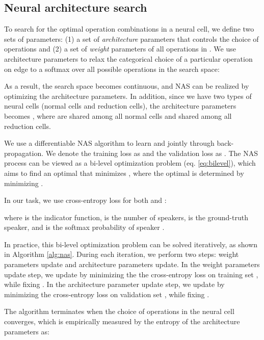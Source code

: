 \documentclass[a4paper]{article}
\begin{document}
\subsection{Neural architecture search}
\label{sec:nas_algorithm}

To search for the optimal operation combinations in a neural cell, we define two sets of parameters: (1) a set of \textit{architecture} parameters  that controls the choice of operations and (2) a set of \textit{weight} parameters  of all operations in . We use architecture parameters  to relax the categorical choice of a particular operation  on edge  to a softmax over all possible operations in the search space:



\noindent
As a result, the search space becomes continuous, and NAS can be realized by optimizing the architecture parameters. In addition, since we have two types of neural cells (normal cells and reduction cells), the architecture parameters becomes , where  are shared among all normal cells and  shared among all reduction cells.

We use a differentiable NAS algorithm \cite{liu2018darts} to learn  and  jointly through back-propagation. We denote the training loss as  and the validation loss as . The NAS process can be viewed as a bi-level optimization problem \cite{colson2007overview} (eq. \ref{eq:bilevel}), which aims to find an optimal  that minimizes , where the optimal  is determined by minimizing .



\noindent
In our task, we use cross-entropy loss for both  and :



\noindent
where  is the indicator function,  is the number of speakers,  is the ground-truth speaker, and  is the softmax probability of speaker . 

In practice, this bi-level optimization problem can be solved iteratively, as shown in Algorithm \ref{alg:nas}. During each iteration, we perform two steps: weight parameters update and architecture parameters update. In the weight parameters update step, we update  by minimizing the the cross-entropy loss on training set , while fixing . In the architecture parameter update step, we update  by minimizing the cross-entropy loss on validation set , while fixing .


The algorithm terminates when the choice of operations in the neural cell converges, which is empirically measured by the entropy of the architecture parameters  as:
\end{document}
